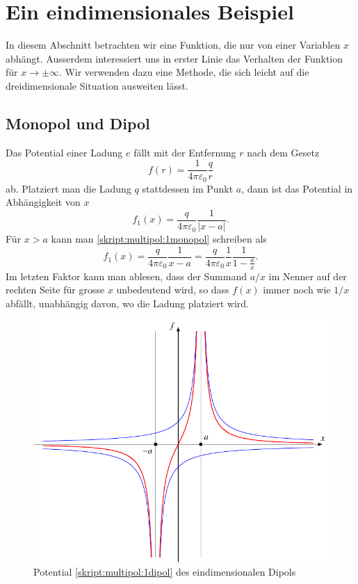 %
%
%
\section{Ein eindimensionales Beispiel%
\label{skript:multipol:1dimbeispiel}}
In diesem Abschnitt betrachten wir eine Funktion, die nur von einer
Variablen $x$ abhängt.
Ausserdem interessiert uns in erster Linie das Verhalten der Funktion
für $x\to\pm\infty$.
Wir verwenden dazu eine Methode, die sich leicht auf die dreidimensionale
Situation ausweiten lässt.

\subsection{Monopol und Dipol}
Das Potential einer Ladung $e$ fällt mit der Entfernung $r$ nach dem
Gesetz
\[
f(r)=\frac1{4\pi\varepsilon_0}\frac{q}r
\]
ab.
Platziert man die Ladung $q$ stattdessen im Punkt $a$, dann ist das
Potential in Abhängigkeit von $x$
\begin{equation}
f_1(x) = \frac{q}{4\pi\varepsilon_0} \frac1{|x-a|}.
\label{skript:multipol:1monopol}
\end{equation}
Für $x>a$ kann man \eqref{skript:multipol:1monopol} schreiben als
\begin{equation}
f_1(x)
=
\frac{q}{4\pi\varepsilon_0} \frac1{x-a}
=
\frac{q}{4\pi\varepsilon_0} \frac1x\frac1{1-\displaystyle\frac{a}{x}}.
\label{skript:multipol:1abfall}
\end{equation}
Im letzten Faktor kann man ablesen, dass der Summand $a/x$ im Nenner
auf der rechten Seite für grosse $x$ unbedeutend wird, so dass $f(x)$
immer noch wie $1/x$ abfällt, unabhängig davon, wo die Ladung platziert
wird.

\begin{figure}
\centering
\includegraphics{chapters/tikz/dipol1.pdf}
\caption{Potential
\eqref{skript:multipol:1dipol}
des eindimensionalen Dipols
\label{skript:multipol:figure:1dim}}
\end{figure}

